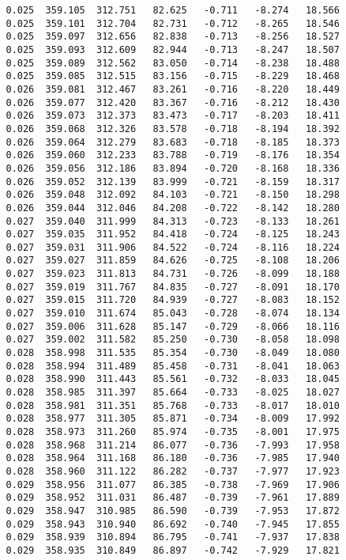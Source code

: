\begin{verbatim}
   0.025  359.105  312.751   82.625   -0.711   -8.274   18.566
   0.025  359.101  312.704   82.731   -0.712   -8.265   18.546
   0.025  359.097  312.656   82.838   -0.713   -8.256   18.527
   0.025  359.093  312.609   82.944   -0.713   -8.247   18.507
   0.025  359.089  312.562   83.050   -0.714   -8.238   18.488
   0.025  359.085  312.515   83.156   -0.715   -8.229   18.468
   0.026  359.081  312.467   83.261   -0.716   -8.220   18.449
   0.026  359.077  312.420   83.367   -0.716   -8.212   18.430
   0.026  359.073  312.373   83.473   -0.717   -8.203   18.411
   0.026  359.068  312.326   83.578   -0.718   -8.194   18.392
   0.026  359.064  312.279   83.683   -0.718   -8.185   18.373
   0.026  359.060  312.233   83.788   -0.719   -8.176   18.354
   0.026  359.056  312.186   83.894   -0.720   -8.168   18.336
   0.026  359.052  312.139   83.999   -0.721   -8.159   18.317
   0.026  359.048  312.092   84.103   -0.721   -8.150   18.298
   0.026  359.044  312.046   84.208   -0.722   -8.142   18.280
   0.027  359.040  311.999   84.313   -0.723   -8.133   18.261
   0.027  359.035  311.952   84.418   -0.724   -8.125   18.243
   0.027  359.031  311.906   84.522   -0.724   -8.116   18.224
   0.027  359.027  311.859   84.626   -0.725   -8.108   18.206
   0.027  359.023  311.813   84.731   -0.726   -8.099   18.188
   0.027  359.019  311.767   84.835   -0.727   -8.091   18.170
   0.027  359.015  311.720   84.939   -0.727   -8.083   18.152
   0.027  359.010  311.674   85.043   -0.728   -8.074   18.134
   0.027  359.006  311.628   85.147   -0.729   -8.066   18.116
   0.027  359.002  311.582   85.250   -0.730   -8.058   18.098
   0.028  358.998  311.535   85.354   -0.730   -8.049   18.080
   0.028  358.994  311.489   85.458   -0.731   -8.041   18.063
   0.028  358.990  311.443   85.561   -0.732   -8.033   18.045
   0.028  358.985  311.397   85.664   -0.733   -8.025   18.027
   0.028  358.981  311.351   85.768   -0.733   -8.017   18.010
   0.028  358.977  311.305   85.871   -0.734   -8.009   17.992
   0.028  358.973  311.260   85.974   -0.735   -8.001   17.975
   0.028  358.968  311.214   86.077   -0.736   -7.993   17.958
   0.028  358.964  311.168   86.180   -0.736   -7.985   17.940
   0.028  358.960  311.122   86.282   -0.737   -7.977   17.923
   0.029  358.956  311.077   86.385   -0.738   -7.969   17.906
   0.029  358.952  311.031   86.487   -0.739   -7.961   17.889
   0.029  358.947  310.985   86.590   -0.739   -7.953   17.872
   0.029  358.943  310.940   86.692   -0.740   -7.945   17.855
   0.029  358.939  310.894   86.795   -0.741   -7.937   17.838
   0.029  358.935  310.849   86.897   -0.742   -7.929   17.821

\end{verbatim}
